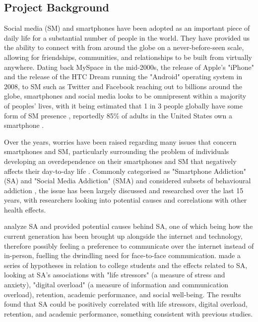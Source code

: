 \documentclass[12pt]{article}
\begin{document}
\subsection{Project Background}
Social media (SM) and smartphones 
have been adopted as an important piece of daily life for a substantial number of people in the world. 
They have provided us the ability to connect with from around the globe on a 
never-before-seen scale, allowing for friendships, communities, and relationships to be built from virtually 
anywhere. Dating back MySpace in the mid-2000s, the release of Apple's "iPhone" and the
release of the HTC Dream running the "Android" operating system in 2008, to SM such as Twitter and Facebook 
reaching out to billions around the globe, smartphones and social 
media looks to be omnipresent within a majority of peoples' lives, with it being estimated that 1 in 3 people 
globally have some form of SM presence \autocite{RefWorks:RefID:88-shah2021rise}, reportedly 85\% of 
adults in the United States own a smartphone \autocite{RefWorks:RefID:94-ouellette2022usefulness}.\newline

Over the years, worries have been raised regarding many issues that concern smartphones and 
SM, particularly surrounding the problem of individuals developing an overdependence on their smartphones 
and SM that negatively affects their day-to-day life 
\autocite{RefWorks:RefID:133-allen2020social, RefWorks:RefID:134-primack2017social}.
Commonly categorised as "Smartphone Addiction" (SA) and "Social Media Addiction" (SMA) and considered 
subsets of behavioural addiction 
\autocite{RefWorks:RefID:68-king2017impact, RefWorks:RefID:66-hou2019social}, the issue has been largely discussed 
and researched over the last 15 years, with researchers looking into potential causes and 
correlations with other health effects.\newline

\textcite{RefWorks:RefID:78-bhalerao2020analysis} analyze SA and provided potential causes 
behind SA, one of which being how the current generation has been brought up alongside the internet 
and technology, therefore possibly feeling a preference to communicate over the internet instead of 
in-person, fuelling the dwindling need for face-to-face communication. \textcite{RefWorks:RefID:68-king2017impact} 
made a series of hypotheses in relation to college students and the effects 
related to SA, looking at SA's associations with "life stressors" (a measure of stress and anxiety), "digital overload" 
(a measure of information and communication overload), retention, academic performance, and social well-being. The results 
found that SA could be positively correlated with life stressors, digital overload, retention, and academic performance, 
something consistent with previous studies.\newline
\end{document}
